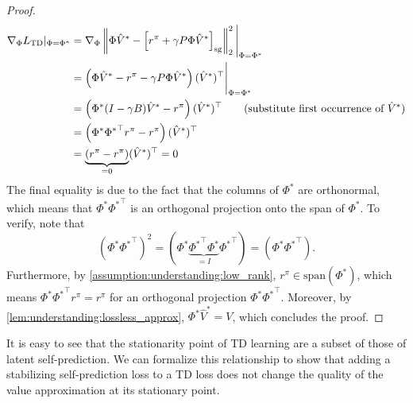 \begin{proof}
    \begin{align}
        \nabla_\Phi L_\text{TD}|_{\Phi = \Phi^*} & =  \nabla_{\Phi} \left\lVert \Phi \hat{V}^* - \left[r^\pi + \gamma P\Phi \hat{V}^*\right]_\text{sg} \right\rVert_2^2\Bigg|_{\Phi = \Phi^*}\\
        & = \left(\Phi \hat{V}^* - r^\pi - \gamma P\Phi {\hat{V}}^*\right) (\hat{V}^*)^\top\Bigg|_{\Phi = \Phi^*} \\
        & = \left(\Phi^* (I - \gamma B) {\hat{V}}^* - r^\pi \right)(\hat{V}^*)^\top \quad\quad \text{(substitute first occurrence of~$\hat{V}^*$)}\\
        & = \left(\Phi^* {\Phi^*}^\top r^\pi - r^\pi \right)({\hat{V}}^*)^\top\\
        & = \underbrace{\left(r^\pi - r^\pi \right)}_{=0}({\hat{V}}^*)^\top = 0
    \end{align}
    The final equality is due to the fact that the columns of $\Phi^*$ are orthonormal, which means that $\Phi^*{\Phi^*}^\top$ is an orthogonal projection onto the span of $\Phi^*$. To verify, note that $$\left(\Phi^*{\Phi^*}^\top\right)^2 = \left(\Phi^* \underbrace{{\Phi^*}^\top \Phi^*}_{=I}{\Phi^*}^\top\right) = \left(\Phi^*{\Phi^*}^\top\right).$$ Furthermore, by \autoref{assumption:understanding:low_rank}, $r^\pi \in \text{span}(\Phi^*)$, which means $\Phi^*{\Phi^*}^\top r^\pi = r^\pi$ for an orthogonal projection $\Phi^*{\Phi^*}^\top$.
    Moreover, by \autoref{lem:understanding:lossless_approx}, $\Phi^* \hat{V}^* = V$, which concludes the proof.
\end{proof}

It is easy to see that the stationarity point of TD learning are a subset of those of latent self-prediction.
We can formalize this relationship to show that adding a stabilizing self-prediction loss to a TD loss does not change the quality of the value approximation at its stationary point.

